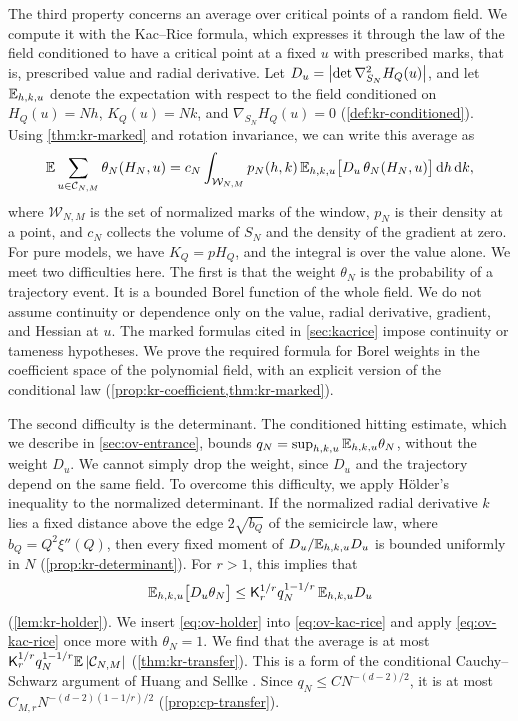 The third property concerns an average over critical points of a random field. We compute it with the Kac--Rice formula, which expresses it through the law of the field conditioned to have a critical point at a fixed $u$ with prescribed marks, that is, prescribed value and radial derivative. Let $D_u=\left|\det\nabla^2_{S_N}H_Q(u)\right|$, and let $\mathbb E_{h,k,u}$ denote the expectation with respect to the field conditioned on $H_Q(u)=Nh$, $K_Q(u)=Nk$, and $\nabla_{S_N}H_Q(u)=0$ (\cref{def:kr-conditioned}). Using \cref{thm:kr-marked} and rotation invariance, we can write this average as
\begin{equation}\label{eq:ov-kac-rice}
\mathbb E\sum_{u\in\mathcal C_{N,M}}\theta_N(H_N,u)=c_N\int_{\mathcal W_{N,M}}p_N(h,k)\,\mathbb E_{h,k,u}\bigl[D_u\,\theta_N(H_N,u)\bigr]\,\mathrm d h\,\mathrm d k,
\end{equation}
where $\mathcal W_{N,M}$ is the set of normalized marks of the window, $p_N$ is their density at a point, and $c_N$ collects the volume of $S_N$ and the density of the gradient at zero. For pure models, we have $K_Q=pH_Q$, and the integral is over the value alone. We meet two difficulties here. The first is that the weight $\theta_N$ is the probability of a trajectory event. It is a bounded Borel function of the whole field. We do not assume continuity or dependence only on the value, radial derivative, gradient, and Hessian at $u$. The marked formulas cited in \cref{sec:kacrice} impose continuity or tameness hypotheses. We prove the required formula for Borel weights in the coefficient space of the polynomial field, with an explicit version of the conditional law (\cref{prop:kr-coefficient,thm:kr-marked}).

The second difficulty is the determinant. The conditioned hitting estimate, which we describe in \cref{sec:ov-entrance}, bounds $q_N=\sup_{h,k,u}\mathbb E_{h,k,u}\theta_N$, without the weight $D_u$. We cannot simply drop the weight, since $D_u$ and the trajectory depend on the same field. To overcome this difficulty, we apply H\"older's inequality to the normalized determinant. If the normalized radial derivative $k$ lies a fixed distance above the edge $2\sqrt{b_Q}$ of the semicircle law, where $b_Q=Q^2\xi''(Q)$, then every fixed moment of $D_u/\mathbb E_{h,k,u}D_u$ is bounded uniformly in $N$ (\cref{prop:kr-determinant}). For $r>1$, this implies that
\begin{equation}\label{eq:ov-holder}
\mathbb E_{h,k,u}\bigl[D_u\theta_N\bigr]\le\mathsf K_r^{1/r}q_N^{1-1/r}\,\mathbb E_{h,k,u}D_u
\end{equation}
(\cref{lem:kr-holder}). We insert \eqref{eq:ov-holder} into \eqref{eq:ov-kac-rice} and apply \eqref{eq:ov-kac-rice} once more with $\theta_N=1$. We find that the average is at most $\mathsf K_r^{1/r}q_N^{1-1/r}\mathbb E\left|\mathcal C_{N,M}\right|$ (\cref{thm:kr-transfer}). This is a form of the conditional Cauchy--Schwarz argument of Huang and Sellke \cite[Corollary~3.16]{HuangSellke2024}. Since $q_N\le CN^{-(d-2)/2}$, it is at most $C_{M,r}N^{-(d-2)(1-1/r)/2}$ (\cref{prop:cp-transfer}).


